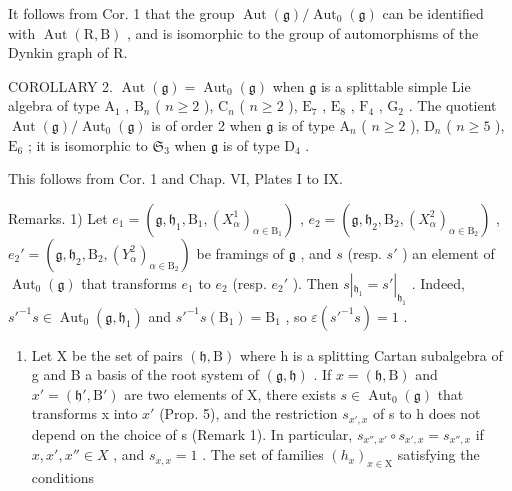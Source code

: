It follows from Cor. 1 that the group \(\operatorname{Aut}(\mathfrak{g})/\operatorname{Aut}_{0}(\mathfrak{g})\) can be identified with \(\operatorname{Aut}(\mathrm{R},\mathrm{B})\) , and is isomorphic to the group of automorphisms of the Dynkin graph of R.

COROLLARY 2. \(\operatorname{Aut}(\mathfrak{g}) = \operatorname{Aut}_0(\mathfrak{g})\) when \(\mathfrak{g}\) is a splittable simple Lie algebra of type \(\mathrm{A}_1\) , \(\mathrm{B}_n\) ( \(n \geq 2\) ), \(\mathrm{C}_n\) ( \(n \geq 2\) ), \(\mathrm{E}_7\) , \(\mathrm{E}_8\) , \(\mathrm{F}_4\) , \(\mathrm{G}_2\) . The quotient \(\operatorname{Aut}(\mathfrak{g}) / \operatorname{Aut}_0(\mathfrak{g})\) is of order 2 when \(\mathfrak{g}\) is of type \(\mathrm{A}_n\) ( \(n \geq 2\) ), \(\mathrm{D}_n\) ( \(n \geq 5\) ), \(\mathrm{E}_6\) ; it is isomorphic to \(\mathfrak{S}_3\) when \(\mathfrak{g}\) is of type \(\mathrm{D}_4\) .

This follows from Cor. 1 and Chap. VI, Plates I to IX.

Remarks. 1) Let \(e_1 = (\mathfrak{g}, \mathfrak{h}_1, \mathrm{B}_1, (X_\alpha^1)_{\alpha \in \mathrm{B}_1})\) , \(e_2 = (\mathfrak{g}, \mathfrak{h}_2, \mathrm{B}_2, (X_\alpha^2)_{\alpha \in \mathrm{B}_2})\) , \(e_2' = (\mathfrak{g}, \mathfrak{h}_2, \mathrm{B}_2, (Y_\alpha^2)_{\alpha \in \mathrm{B}_2})\) be framings of \(\mathfrak{g}\) , and \(s\) (resp. \(s'\) ) an element of \(\operatorname{Aut}_0(\mathfrak{g})\) that transforms \(e_1\) to \(e_2\) (resp. \(e_2'\) ). Then \(s|_{\mathfrak{h}_1} = s'|_{\mathfrak{h}_1}\) . Indeed, \(s'^{-1}s \in \operatorname{Aut}_0(\mathfrak{g}, \mathfrak{h}_1)\) and \(s'^{-1}s(\mathrm{B}_1) = \mathrm{B}_1\) , so \(\varepsilon(s'^{-1}s) = 1\) .

\begin{enumerate}
\def\labelenumi{\arabic{enumi})}
\setcounter{enumi}{1}
\tightlist
\item
  Let X be the set of pairs \((\mathfrak{h},\mathrm{B})\) where h is a splitting Cartan subalgebra of g and B a basis of the root system of \((\mathfrak{g},\mathfrak{h})\) . If \(x=(\mathfrak{h},\mathrm{B})\) and \(x'=(\mathfrak{h}',\mathrm{B}')\) are two elements of X, there exists \(s\in\operatorname{Aut}_{0}(\mathfrak{g})\) that transforms x into \(x'\) (Prop. 5), and the restriction \(s_{x',x}\) of s to h does not depend on the choice of s (Remark 1). In particular, \(s_{x'',x'}\circ s_{x',x}=s_{x'',x}\) if \(x,x',x''\in X\) , and \(s_{x,x}=1\) . The set of families \((h_{x})_{x\in\mathrm{X}}\) satisfying the conditions
\end{enumerate}

